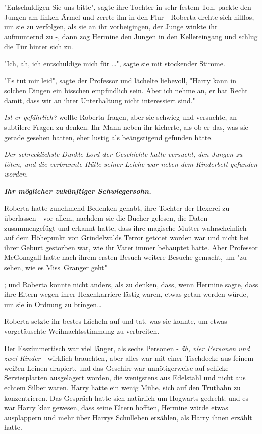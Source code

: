{"Entschuldigen Sie uns bitte", sagte ihre Tochter in sehr festem Ton, packte den Jungen am linken Ärmel und zerrte ihn in den Flur - Roberta drehte sich hilflos, um sie zu verfolgen, als sie an ihr vorbeigingen, der Junge winkte ihr aufmunternd zu -, dann zog Hermine den Jungen in den Kellereingang und schlug die Tür hinter sich zu.

"Ich, ah, ich entschuldige mich für …", sagte sie mit stockender Stimme.

"Es tut mir leid", sagte der Professor und lächelte liebevoll, "Harry kann in solchen Dingen ein bisschen empfindlich sein. Aber ich nehme an, er hat Recht damit, dass wir an ihrer Unterhaltung nicht interessiert sind."

\emph{Ist er gefährlich?} wollte Roberta fragen, aber sie schwieg und versuchte, an subtilere Fragen zu denken. Ihr Mann neben ihr kicherte, als ob er das, was sie gerade gesehen hatten, eher lustig als beängstigend gefunden hätte.

\emph{Der schrecklichste Dunkle Lord der Geschichte hatte versucht, den Jungen zu töten, und die verbrannte Hülle seiner Leiche war neben dem Kinderbett gefunden worden.}

\textbf{\emph{Ihr möglicher zukünftiger Schwiegersohn.}}

Roberta hatte zunehmend Bedenken gehabt, ihre Tochter der Hexerei zu überlassen - vor allem, nachdem sie die Bücher gelesen, die Daten zusammengefügt und erkannt hatte, dass ihre magische Mutter wahrscheinlich auf dem Höhepunkt von Grindelwalds Terror getötet worden war und nicht bei ihrer Geburt gestorben war, wie ihr Vater immer behauptet hatte. Aber Professor McGonagall hatte nach ihrem ersten Besuch weitere Besuche gemacht, um "zu sehen, wie es Miss~Granger geht"

; und Roberta konnte nicht anders, als zu denken, dass, wenn Hermine sagte, dass ihre Eltern wegen ihrer Hexenkarriere lästig waren, etwas getan werden würde, um sie in Ordnung zu bringen…

Roberta setzte ihr bestes Lächeln auf und tat, was sie konnte, um etwas vorgetäuschte Weihnachtsstimmung zu verbreiten.

Der Esszimmertisch war viel länger, als sechs Personen - \emph{äh, vier Personen und zwei Kinder} - wirklich brauchten, aber alles war mit einer Tischdecke aus feinem weißen Leinen drapiert, und das Geschirr war unnötigerweise auf schicke Servierplatten ausgelagert worden, die wenigstens aus Edelstahl und nicht aus echtem Silber waren. Harry hatte ein wenig Mühe, sich auf den Truthahn zu konzentrieren. Das Gespräch hatte sich natürlich um Hogwarts gedreht; und es war Harry klar gewesen, dass seine Eltern hofften, Hermine würde etwas ausplappern und mehr über Harrys Schulleben erzählen, als Harry ihnen erzählt hatte.

}
